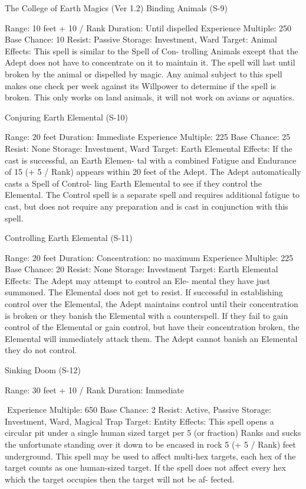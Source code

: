 \begin{Chapter}{The College of Earth Magics (Ver 1.2)}
Binding Animals (S-9) 

Range: 10 feet + 10 / Rank 
Duration: Until dispelled 
Experience Multiple: 250 
Base Chance: 10%
Resist: Passive 
Storage: Investment, Ward 
Target: Animal 
Effects:  This  spell  is  similar  to  the  Spell  of  Con-
trolling  Animals  except  that  the  Adept  does  not 
have  to  concentrate  on  it  to  maintain  it.  The  spell 
will last until broken by the animal or dispelled by 
magic. Any animal subject to this spell makes one 
check per week against its Willpower to determine 
if  the  spell  is  broken.  This  only  works  on  land 
animals, it will not work on avians or aquatics. 

Conjuring Earth Elemental (S-10) 

Range: 20 feet 
Duration: Immediate 
Experience Multiple: 225 
Base Chance: 25%
Resist: None 
Storage: Investment, Ward 
Target: Earth Elemental 
Effects:  If the cast is successful, an Earth Elemen-
tal  with  a  combined  Fatigue  and  Endurance  of  15 
(+  5  /  Rank)  appears  within  20  feet  of  the  Adept. 
The  Adept  automatically  casts  a  Spell  of  Control-
ling  Earth  Elemental  to  see  if  they  control  the 
Elemental. The Control spell is a separate spell and 
requires  additional  fatigue  to  cast,  but  does  not 
require  any  preparation  and  is  cast  in  conjunction 
with this spell. 

Controlling Earth Elemental (S-11) 

Range: 20 feet 
Duration: Concentration: no maximum 
Experience Multiple: 225 
Base Chance: 20%
Resist: None 
Storage: Investment 
Target: Earth Elemental 
Effects: The  Adept may attempt to control an Ele-
mental  they  have  just  summoned.  The  Elemental 
does  not  get  to  resist.  If  successful  in  establishing 
control  over  the  Elemental,  the  Adept  maintains 
control  until  their  concentration  is  broken  or  they 
banish  the  Elemental  with  a  counterspell.  If  they 
fail to gain control of the Elemental or gain control, 
but have their concentration broken, the Elemental 
will  immediately  attack  them.  The  Adept  cannot 
banish an Elemental they do not control. 

Sinking Doom (S-12) 

Range: 30 feet + 10 / Rank 
Duration: Immediate 

Experience Multiple: 650 
Base Chance: 2%
Resist: Active, Passive 
Storage: Investment, Ward, Magical Trap 
Target: Entity 
Effects:  This  spell  opens  a  circular  pit  under  a 
single human sized target per 5 (or fraction) Ranks 
and sucks the unfortunate standing over it down to 
be encased in rock 5 (+ 5 / Rank) feet underground. 
This spell may be used to affect multi-hex targets, 
each  hex  of  the  target  counts  as  one  human-sized 
target. If the spell does not affect every hex which 
the  target  occupies  then  the  target  will  not  be  af-
fected. 


\end{Chapter}

